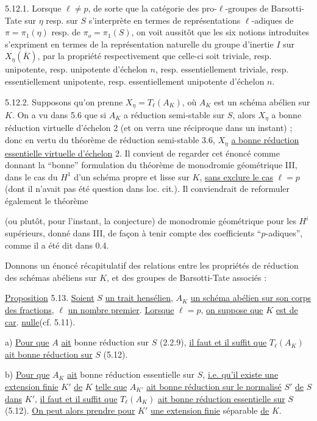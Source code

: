 5.12.1.  Lorsque $\ell \neq p$, de sorte que la catégorie des pro-$\ell$-groupes de Barsotti-Tate sur $\eta$ resp. sur $S$ s'interprète en termes de représentations $\ell$-adiques de $\pi = \pi_1(\eta)$ resp. de $\pi_o = \pi_1(S)$, on voit aussitôt que les six notions introduites s'expriment en termes de la représentation naturelle du groupe d'inertie $I$ sur $X_\eta(\overline{K})$, par la propriété respectivement que celle-ci soit triviale, resp. unipotente, resp. unipotente d'échelon $n$, resp. essentiellement triviale, resp. essentiellement unipotente, resp. essentiellement unipotente d'échelon $n$.

5.12.2.  Supposons qu'on prenne $X_\eta = T_\ell(A_K)$, où $A_K$ est un schéma abélien sur $K$. On a vu dans 5.6 que si $A_K$ a réduction semi-stable sur $S$, alors $X_\eta$ a bonne réduction virtuelle d'échelon 2 (et on verra une réciproque dans un instant) ; donc en vertu du théorème de réduction semi-stable 3.6, $X_\eta$ \underline{a bonne réduction essentielle virtuelle d'échelon} 2. Il convient de regarder cet énoncé comme donnant la ``bonne'' formulation du théorème de monodromie géométrique III\hspace{2em}, dans le cas du $H^1$ d'un schéma propre et lisse sur $K$, \underline{sans exclure le cas} $\ell = p$ (dont il n'avait pas été question dans loc. cit.). Il conviendrait de reformuler également le théorème



(ou plutôt, pour l'instant, la conjecture) de monodromie géométrique pour les $H^i$ supérieurs, donné dans III\hspace{2em}, de façon à tenir compte des coefficients ``$p$-adiques'', comme il a été dit dans 0.4.

Donnons un énoncé récapitulatif des relations entre les propriétés de réduction des schémas abéliens sur $K$, et des groupes de Barsotti-Tate associés :

\underline{Proposition} 5.13.  \underline{Soient} $S$ \underline{un trait hensélien}, $A_K$ \underline{un schéma abélien sur son corps des fractions}, $\ell$ \underline{un nombre premier}. \underline{Lorsque} $\ell = p$, \underline{on suppose que} $K$ \underline{est de car}. \underline{nulle}(cf. 5.11).

a) \underline{Pour que} $A$ \underline{ait} bonne réduction sur $S$ (2.2.9), \underline{il faut et il suffit que} $T_\ell(A_K)$ \underline{ait bonne réduction sur} $S$ (5.12).

b) \underline{Pour que} $A_K$ \underline{ait} bonne réduction essentielle sur $S$, \underline{i.e. qu'il existe une extension finie} $K'$ \underline{de} $K$ \underline{telle que} $A_{K'}$ \underline{ait bonne réduction sur le normalisé} $S'$ \underline{de} $S$ \underline{dans} $K'$, \underline{il faut et il suffit que} $T_\ell(A_K)$ \underline{ait bonne réduction essentielle sur} $S$ (5.12). \underline{On peut alors prendre pour} $K'$ \underline{une extension finie} séparable \underline{de} $K$.

